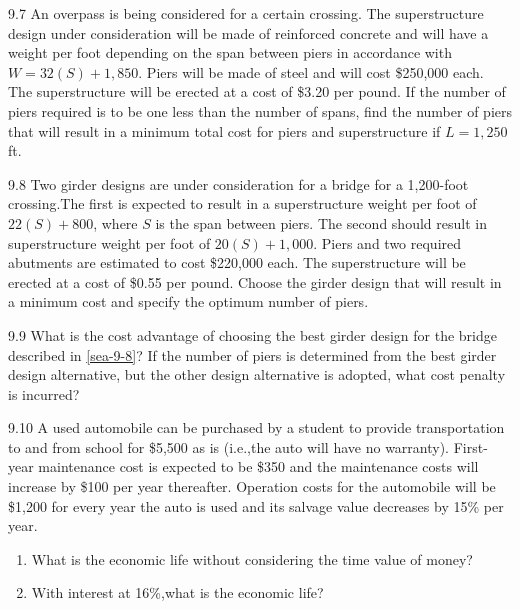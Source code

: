 \begin{exsol@solution}{}
\end{exsol@solution}
\begin{exsol@exercise}{9.7}
    \label{sea-9-7}
        An overpass is being considered for a certain crossing. The superstructure design under consideration will be made of reinforced concrete and will have a weight per foot depending on the span between piers in accordance with $W=32(S)+1,850$. Piers will be made of steel and will cost \$250,000 each. The superstructure will be erected at a cost of \$3.20 per pound. If the number of piers required is to be one less than the number of spans, find the number of piers that will result in a minimum total cost for piers and superstructure if $L=1,250$ft.
\end{exsol@exercise}
\begin{exsol@solution}{}
\end{exsol@solution}
\begin{exsol@exercise}{9.8}
    \label{sea-9-8}
        Two girder designs are under consideration for a bridge for a 1,200-foot crossing.The first is expected to result in a superstructure weight per foot of $22(S)+800$, where $S$ is the span between piers. The second should result in superstructure weight per foot of $20(S)+1,000$. Piers and two required abutments are estimated to cost \$220,000 each. The superstructure will be erected at a cost of \$0.55 per pound. Choose the girder design that will result in a minimum cost and specify the optimum number of piers.
\end{exsol@exercise}
\begin{exsol@solution}{}
\end{exsol@solution}
\begin{exsol@exercise}{9.9}
    \label{sea-9-9}
        What is the cost advantage of choosing the best girder design for the bridge described in \ref{sea-9-8}? If the number of piers is determined from the best girder design alternative, but the other design alternative is adopted, what cost penalty is incurred?
\end{exsol@exercise}
\begin{exsol@solution}{}
\end{exsol@solution}
\begin{exsol@exercise}{9.10}
    \label{sea-9-10}
        A used automobile can be purchased by a student to provide transportation to and from school for \$5,500 as is (i.e.,the auto will have no warranty). First-year maintenance cost is expected to be \$350 and the maintenance costs will increase by \$100 per year thereafter. Operation costs for the automobile will be \$1,200 for every year the auto is used and its salvage value decreases by 15\% per year.
        \begin{enumerate}[label=\alph*)]
            \item What is the economic life without considering the time value of money?
            \item With interest at 16\%,what is the economic life?
        \end{enumerate}
\end{exsol@exercise}
\begin{exsol@solution}{}
\end{exsol@solution}
